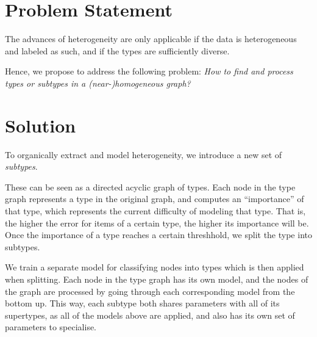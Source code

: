 \section{Problem Statement} \label{sec:problem_statement}
The advances of heterogeneity are only applicable if the data is heterogeneous and labeled as such, and if the types are sufficiently diverse.

Hence, we propose to address the following problem:
% 
\emph{How to find and process types or subtypes in a (near-)homogeneous graph?}

% 



\section{Solution} \label{sec:solution}


To organically extract and model heterogeneity, we introduce a new set of \emph{subtypes}.

These can be seen as a directed acyclic graph of types.
Each node in the type graph represents a type in the original graph, and computes an ``importance'' of that type,
which represents the current difficulty of modeling that type.
That is, the higher the error for items of a certain type, the higher its importance will be.
Once the importance of a type reaches a certain threshhold, we split the type into subtypes.
% 
% 
% 
%

We train a separate model for classifying nodes into types which is then applied when splitting.
Each node in the type graph has its own model, and the nodes of the graph are processed by going through each corresponding model from the bottom up.
This way, each subtype both shares parameters with all of its supertypes, as all of the models above are applied,
and also has its own set of parameters to specialise.

